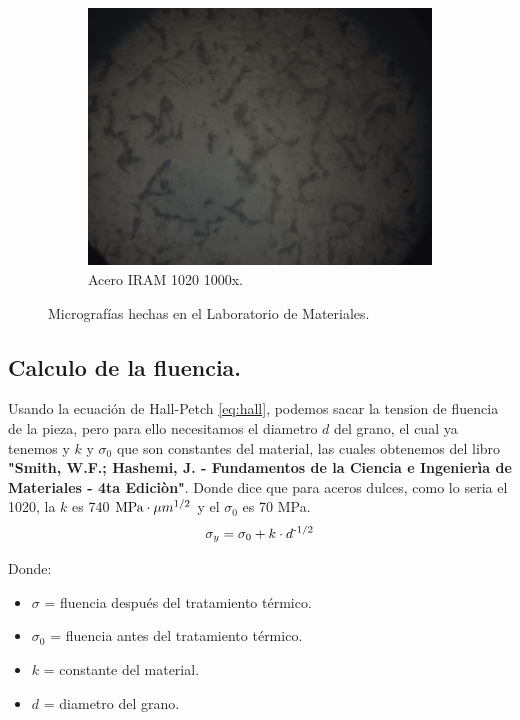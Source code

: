 \documentclass[12pt,a4paper]{article}
\begin{document}
\begin{figure}[h!]
    \begin{subfigure}[b]{0.6\linewidth}
        \centering
        \includegraphics[width=\linewidth]{Figuras/Del-Rio_8.png}
        \caption{Acero IRAM 1020 1000x.}
        \label{1000x}
    \end{subfigure}
    \caption{Micrografías hechas en el Laboratorio de Materiales.}
    \label{fig:metalografia}
\end{figure}

\subsection{Calculo de la fluencia.}
Usando la ecuación de Hall-Petch \autoref{eq:hall}, podemos sacar la tension de fluencia de la pieza, pero para ello necesitamos el diametro $d$ del grano, el cual ya tenemos y $k$ y $\sigma_0$ que son constantes del material, las cuales obtenemos del libro \textbf{"Smith, W.F.; Hashemi, J. - Fundamentos de la Ciencia e Ingenierìa de Materiales - 4ta Ediciòn"}. 
Donde dice que para aceros dulces, como lo seria el 1020, la $k$ es 740 $\text{MPa}\cdot \mu m\textsuperscript{1/2}$ y el $\sigma_0$ es 70 MPa.
\begin{equation}
    \sigma_y = \sigma_0 +k\cdot d \textsuperscript{-1/2}
    \label{eq:hall}
\end{equation}

Donde:
\begin{itemize}
    \item $\sigma$ = fluencia después del tratamiento térmico.
    \item $\sigma_0$ = fluencia antes del tratamiento térmico.
    \item $k$ = constante del material.
    \item $d$ = diametro del grano.
\end{itemize}
\end{document}
